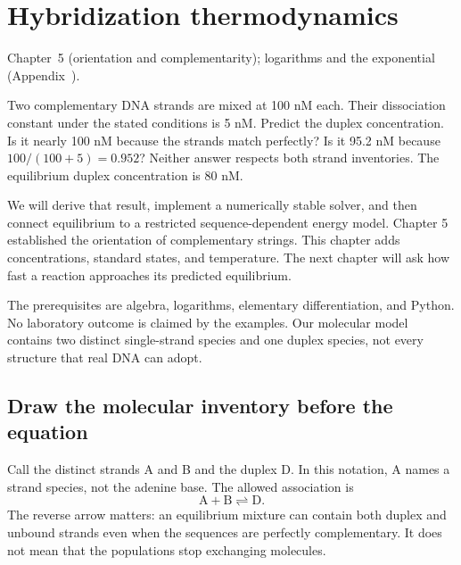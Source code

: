 \chapter{Hybridization thermodynamics}
{Chapter~5 (orientation and complementarity); logarithms and the exponential (Appendix~).}

Two complementary DNA strands are mixed at 100 nM each. Their dissociation
constant under the stated conditions is 5 nM. Predict the duplex concentration.
Is it nearly 100 nM because the strands match perfectly? Is it 95.2 nM
because $100/(100+5)=0.952$? Neither answer respects both strand inventories.
The equilibrium duplex concentration is 80 nM.

We will derive that result, implement a numerically stable solver, and then
connect equilibrium to a restricted sequence-dependent energy model.
Chapter 5 established the orientation of complementary strings. This chapter
adds concentrations, standard states, and temperature. The next chapter will
ask how fast a reaction approaches its predicted equilibrium.

The prerequisites are algebra, logarithms, elementary differentiation, and
Python. No laboratory outcome is claimed by the examples. Our molecular
model contains two distinct single-strand species and one duplex species,
not every structure that real DNA can adopt.

\section{Draw the molecular inventory before the equation}

Call the distinct strands A and B and the duplex D. In this notation,
A names a strand species, not the adenine base. The allowed association is
\begin{equation}
\mathrm{A}+\mathrm{B}\rightleftharpoons\mathrm{D}.
\label{eq:association}
\end{equation}
The reverse arrow matters: an equilibrium mixture can contain both duplex
and unbound strands even when the sequences are perfectly complementary.
It does not mean that the populations stop exchanging molecules.

